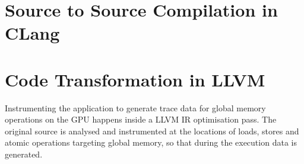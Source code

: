 \section{Source to Source Compilation in CLang}\label{sec:impl:clang}
%
%
\section{Code Transformation in LLVM}
Instrumenting the application to generate trace data for global memory operations on the GPU happens inside a LLVM IR optimisation pass. The original source is analysed and instrumented at the locations of loads, stores and atomic operations targeting global memory, so that during the execution data is generated.

